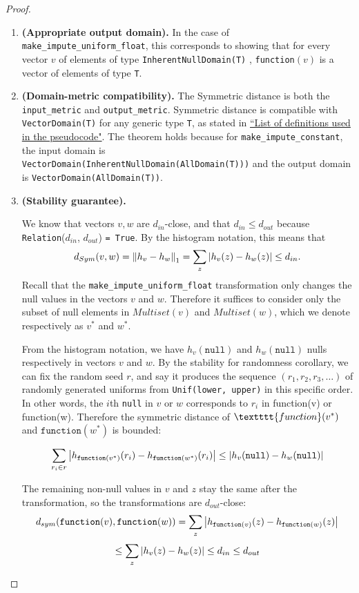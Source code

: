 \documentclass[11pt,a4paper]{article}
\newcommand{\grace}[1]{{ {\color{purple}{(grace)~#1}}}}
\begin{document}
\begin{proof}
\begin{enumerate}
    \item \textbf{(Appropriate output domain).} In the case of \texttt{make\_impute\_uniform\_float}, this corresponds to showing that for every vector $v$ of elements of type \texttt{InherentNullDomain(T)} \grace{T? or InherentNullDomain???}, \texttt{function}$(v)$ is a vector of elements of type \texttt{T}. 
    
    \grace{TODO We show the type signature + nullity works}
    
    \item \textbf{(Domain-metric compatibility).} The Symmetric distance is both the \texttt{input\_metric} and \texttt{output\_metric}. Symmetric distance is compatible with \texttt{VectorDomain(T)} for any generic type \texttt{T}, as stated in \href{https://www.overleaf.com/project/60d215bf90b337ac02200a99}{``List of definitions used in the pseudocode"}. The theorem holds because for \texttt{make\_impute\_constant}, the input domain is \\ \texttt{VectorDomain(InherentNullDomain(AllDomain(T)))} and the output domain is \texttt{VectorDomain(AllDomain(T))}. 
    \item \textbf{(Stability guarantee).}
    
    We know that vectors $v, w$ are $d_{in}$-close, and that $d_{in} \leq d_{out}$ because \texttt{Relation}($d_{in}$, $d_{out}$) \texttt{= True}. By the histogram notation, this means that $$d_{Sym}(v, w) = \norm{h_v - h_w}_1 = \sum_{z} \abs{h_v(z) - h_w(z)} \leq d_{in}.$$ Recall that the \texttt{make\_impute\_uniform\_float} transformation only changes the null values in the vectors $v$ and $w$. Therefore it suffices to consider only the subset of null elements in $Multiset(v)$ and $Multiset(w)$, which we denote respectively as $v^*$ and $w^*$. 
    
    From the histogram notation, we have $h_v(\texttt{null})$ and $h_w(\texttt{null})$ nulls respectively in vectors $v$ and $w$. By the stability for randomness corollary, we can fix the random seed $r$, and say it produces the sequence $(r_1, r_2, r_3, \ldots)$ of randomly generated uniforms from \texttt{Unif(lower, upper)} in this specific order. In other words, the $i$th \texttt{null} in $v$ or $w$ corresponds to $r_i$ in function(v) or function(w). Therefore the symmetric distance of $\textttt{function}(v^*)$ and  $\texttt{function}(w^*)$ is bounded:
    
    
    $$\sum_{r_i \in r} \abs{h_{\texttt{function}(v^*)}(r_i) - h_{\texttt{function}(w^*)}(r_i)} \leq \abs{h_{v}(\texttt{null}) - h_{w}(\texttt{null})}$$
    
    The remaining non-null values in $v$ and $z$ stay the same after the transformation, so the transformations are $d_{out}$-close: $$d_{sym}(\texttt{function}(v), \texttt{function}(w)) = \sum_z \abs{h_{\texttt{function}(v)}(z) - h_{\texttt{function}(w)}(z)}$$
    $$\leq \sum_z \abs{h_v(z) - h_w(z)} \leq d_{in} \leq d_{out}$$ 
    
    


    
\end{enumerate}
\end{proof}
\end{document}
